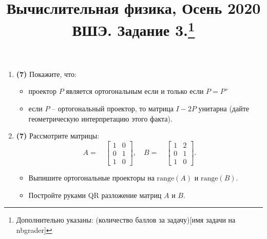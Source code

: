 \documentclass[prb,papersize=a4paper,notitlepage]{revtex4-1}%
\begin{document}
\title{Вычислительная физика, Осень 2020 ВШЭ. Задание 3.\footnote{Дополнительно указаны: (количество баллов за задачу)[имя задачи на nbgrader]}}
\maketitle


\begin{enumerate}
\item \textbf{(7)} Покажите, что:
\begin{itemize}
\item проектор $P$ является ортогональным если и только если $P = P^+$
\item если $P$ -- ортогональный проектор, то матрица $I-2P$ унитарна (дайте геометрическую интерпретацию этого факта).
\end{itemize}

\item \textbf{(7)} Рассмотрите матрицы:
$$
A=\quad\begin{bmatrix}
1 & 0\\
0 & 1\\
1 & 0
\end{bmatrix},\quad
B=\quad\begin{bmatrix}
1 & 2\\
0 & 1\\
1 & 0
\end{bmatrix}.
$$
\begin{itemize}
\item Выпишите ортогональные проекторы на $\mathrm{range}(A)$ и $\mathrm{range}(B)$.
\item Постройте руками QR разложение матриц $A$ и $B$.
\end{itemize}


\end{enumerate}
\end{document}
